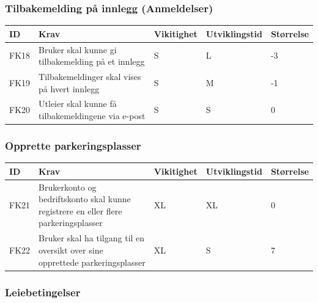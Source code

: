 \documentclass[12pt]{article}
\newcommand{\cellr}{\cellcolor{red!25}}
\newcommand{\cello}{\cellcolor{orange!25}}
\newcommand{\cellg}{\cellcolor{green!25}}
\begin{document}
        \subsubsection{Tilbakemelding på innlegg (Anmeldelser)}
        
        \begin{tabular}{|p{2cm}|p{6cm}|
            >{\centering\arraybackslash}p{2cm}|
            >{\centering\arraybackslash}p{2cm}|
            >{\centering\arraybackslash}p{2cm}|} 
            \hline
            \bf ID & \bf Krav & \bf Vikitighet & \bf Utviklingstid & \bf Størrelse\\
            \hline
            FK18
            &
            Bruker skal kunne gi tilbakemelding på et innlegg
            & S & L & \cellr -3\\
            \hline
            FK19
            &
            Tilbakemeldinger skal vises på hvert innlegg
            & S & M & \cello -1\\
            \hline
            FK20
            &
            Utleier skal kunne få tilbakemeldingene via e-post
            & S & S & \cellg 0\\
            \hline
        \end{tabular}
        
        \subsubsection{Opprette parkeringsplasser}

        \begin{tabular}{|p{2cm}|p{6cm}|
            >{\centering\arraybackslash}p{2cm}|
            >{\centering\arraybackslash}p{2cm}|
            >{\centering\arraybackslash}p{2cm}|} 
            \hline
            \bf ID & \bf Krav & \bf Vikitighet & \bf Utviklingstid & \bf Størrelse\\
            \hline
            FK21
            &
            Brukerkonto og bedriftskonto skal kunne registrere en eller flere parkeringsplasser
            & XL & XL & \cellg 0\\
            \hline
            FK22
            &
            Bruker skal ha tilgang til en oversikt over sine opprettede parkeringsplasser
            & XL & S & \cellg 7 \\
            \hline
        \end{tabular}

        \subsubsection{Leiebetingelser}
        
\end{document}
